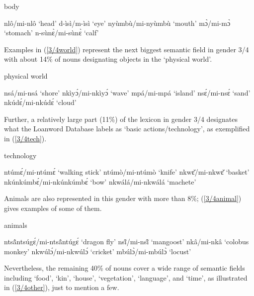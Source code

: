 \begin{exe}
\ex\label{3/4body} body
\begin{xlist}
\ex nlô/mi-nlô `head'
\ex d-ìsì/m-ìsì `eye'
\ex nyùmbù/mi-nyùmbù `mouth'
\ex mɔ̀/mi-mɔ̀ `stomach'
\ex n-sùnɛ̀/mi-sùnɛ̀ `calf'
\end{xlist}
\end{exe}

\noindent Examples in (\ref{3/4world}) represent the next biggest semantic field in gender 3/4 with about 14\% of nouns designating objects in the `physical world'.

\begin{exe}
\ex\label{3/4world} physical world
\begin{xlist}
\ex nsá/mi-nsá `shore'
\ex nkìyɔ́/mi-nkìyɔ́ `wave'
\ex mpá/mi-mpá `island'
\ex nsɛ́/mi-nsɛ́ `sand'
\ex nkúdɛ́/mi-nkúdɛ́ `cloud'
\end{xlist}
\end{exe}

\noindent Further, a relatively large part (11\%) of the lexicon in gender 3/4 designates what the Loanword Database labels as `basic actions/technology', as exemplified in (\ref{3/4tech}). 

\begin{exe}
\ex\label{3/4tech} technology
\begin{xlist}
\ex ntúmɛ́/mi-ntúmɛ́ `walking stick'
\ex ntúmò/mi-ntúmò `knife'
\ex nkwɛ̌/mi-nkwɛ̌ `basket'
\ex nkúnkúmbɛ́/mi-nkúnkúmbɛ́ `bow'
\ex nkwálá/mi-nkwálá `machete'
\end{xlist}
\end{exe}

\noindent Animals are also represented in this gender with more than 8\%; (\ref{3/4animal}) gives examples of some of them.

\begin{exe}
\ex\label{3/4animal} animals
\begin{xlist}
\ex ntsã̂ntsúgɛ́/mi-ntsã̂ntúgɛ́ `dragon fly'
\ex nsĩ̂/mi-nsĩ̂ `mangoost'
\ex nkâ/mi-nkâ `colobus monkey'
\ex nkwúlɔ́/mi-nkwúlɔ́ `cricket'
\ex mbúlɔ̀/mi-mbúlɔ̀ `locust'
\end{xlist}
\end{exe}

\noindent Nevertheless, the remaining 40\% of nouns cover a wide range of semantic fields including `food', `kin', `house', `vegetation', `language', and `time', as illustrated in (\ref{3/4other}), just to mention a few. 

